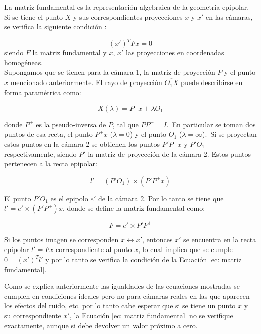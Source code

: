La matriz fundamental es la representación algebraica de la geometría epipolar. Si se tiene el punto $X$ y sus correspondientes proyecciones $x$ y $x'$ en las cámaras, se verifica la siguiente condición :

\begin{equation}
(x')^T F x = 0
\label{ec: matriz fundamental}
\end{equation}
siendo  $F$ la matriz fundamental y $x$, $x'$ las proyecciones en coordenadas homogéneas.\\

Supongamos que se tienen para la cámara 1, la matriz de proyección $P$ y el punto $x$ mencionado anteriormente. El rayo de proyección $\overline{O_1X}$  puede describirse en forma paramétrica como:

\begin{equation}
	X(\lambda) = P^+x+\lambda O_1
\end{equation}

donde $P^+$ es la pseudo-inversa de $P$, tal que $PP^+=I$.\
En particular se toman dos puntos de esa recta, el punto $P^+x$ ($\lambda = 0$) y el punto $O_1$ ($\lambda = \infty$).\
Si se proyectan estos puntos en la cámara 2 se obtienen los puntos $P'P^+x$ y $P'O_1$ respectivamente, siendo $P'$ la matriz de proyección de la cámara 2. Estos puntos pertenecen a la recta epipolar:

\begin{equation}
l' = (P'O_1) \times (P'P^+ x)
\end{equation}

El punto $P'O_1$ es el epipolo $e'$ de la cámara 2. Por lo tanto se tiene que\\$l' = e' \times (P'P^+) x$, donde se define la matriz fundamental como:

\begin{equation}
F=e' \times P'P^+
\end{equation}

Si los puntos imagen se corresponden $x \leftrightarrow x'$, entonces $x'$ se encuentra en la recta epipolar $l'=Fx$ correspondiente al punto $x$, lo cual implica que se cumple $0=(x')^Tl'$ y por lo tanto se verifica la condición de la Ecuación \ref{ec: matriz fundamental}. 

Como se explica anteriormente las igualdades de las ecuaciones mostradas se cumplen en condiciones ideales pero no para cámaras reales en las que aparecen los efectos del ruido, etc. por lo tanto cabe esperar que si se tiene un punto $x$ y su correspondiente $x'$, la Ecuación \ref{ec: matriz fundamental} no se verifique exactamente, aunque si debe devolver un valor próximo a cero.\\

